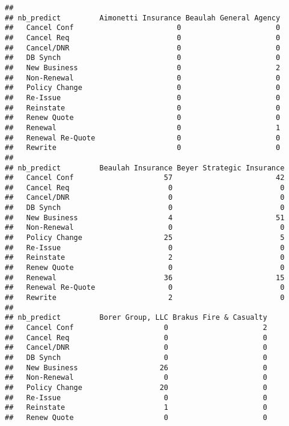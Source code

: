 \documentclass[]{article}
\begin{document}
\begin{verbatim}
##                   
## nb_predict         Aimonetti Insurance Beaulah General Agency
##   Cancel Conf                        0                      0
##   Cancel Req                         0                      0
##   Cancel/DNR                         0                      0
##   DB Synch                           0                      0
##   New Business                       0                      2
##   Non-Renewal                        0                      0
##   Policy Change                      0                      0
##   Re-Issue                           0                      0
##   Reinstate                          0                      0
##   Renew Quote                        0                      0
##   Renewal                            0                      1
##   Renewal Re-Quote                   0                      0
##   Rewrite                            0                      0
##                   
## nb_predict         Beaulah Insurance Beyer Strategic Insurance
##   Cancel Conf                     57                        42
##   Cancel Req                       0                         0
##   Cancel/DNR                       0                         0
##   DB Synch                         0                         0
##   New Business                     4                        51
##   Non-Renewal                      0                         0
##   Policy Change                   25                         5
##   Re-Issue                         0                         0
##   Reinstate                        2                         0
##   Renew Quote                      0                         0
##   Renewal                         36                        15
##   Renewal Re-Quote                 0                         0
##   Rewrite                          2                         0
##                   
## nb_predict         Borer Group, LLC Brakus Fire & Casualty
##   Cancel Conf                     0                      2
##   Cancel Req                      0                      0
##   Cancel/DNR                      0                      0
##   DB Synch                        0                      0
##   New Business                   26                      0
##   Non-Renewal                     0                      0
##   Policy Change                  20                      0
##   Re-Issue                        0                      0
##   Reinstate                       1                      0
##   Renew Quote                     0                      0

\end{verbatim}
\end{document}
